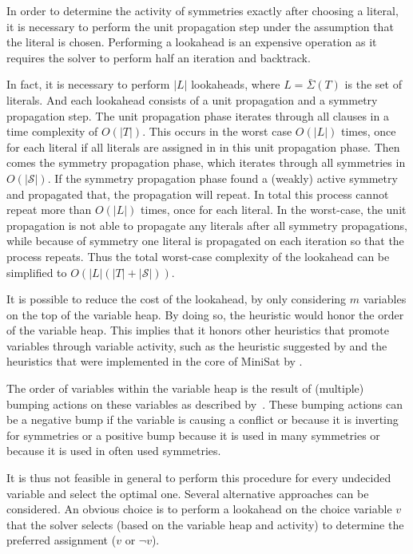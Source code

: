 	In order to determine the activity of symmetries exactly after choosing a literal,
	it is necessary to perform the unit propagation step under the assumption that the literal is chosen.
	Performing a lookahead is an expensive operation as it requires the solver to perform half an
	iteration and backtrack.

	In fact, it is necessary to perform $|L|$ lookaheads, where $L = \bar{\Sigma}(T)$ is the set of literals.
	And each lookahead consists of a unit propagation and a symmetry propagation step.
	The unit propagation phase iterates through all clauses in a time complexity of $O(|T|)$.
	This occurs in the worst case $O(|L|)$ times,
	once for each literal if all literals are assigned in in this unit propagation phase.
	Then comes the symmetry propagation phase, which iterates through all symmetries in $O(|\mathcal{S}|)$.
	If the symmetry propagation phase found a (weakly) active symmetry and propagated that,
	the propagation will repeat.
	In total this process cannot repeat more than $O(|L|)$ times, once for each literal.
	In the worst-case, the unit propagation is not able to propagate any literals after all symmetry propagations,
	while because of symmetry one literal is propagated on each iteration so that the process repeats.
	Thus the total worst-case complexity of the lookahead can be simplified to $O(|L|(|T| + |\mathcal{S}|))$.

	It is possible to reduce the cost of the lookahead, by only considering $m$ variables on
	the top of the variable heap.
	By doing so, the heuristic would honor the order of the variable heap.
	This implies that it honors other heuristics that promote variables through variable activity,
	such as the heuristic suggested by \cite{devriendt2012symmetry} and the heuristics that were
	implemented in the core of MiniSat by \cite{een2004extensible}.
	
	The order of variables within the variable heap is the result of (multiple) bumping actions on these variables
	as described by~\cite{devriendt2012symmetry}.
	These bumping actions can be a negative bump if the variable is causing a conflict or because it is inverting 
	for symmetries or a positive bump because it is used in many symmetries or because it is used in often used 
	symmetries.

	It is thus not feasible in general to perform this procedure for every undecided variable and
	select the optimal one.
	Several alternative approaches can be considered.
	An obvious choice is to perform a lookahead on the choice variable $v$ that the solver
	selects (based on the variable heap and activity) to determine the
	preferred assignment ($v$ or $\neg v$).

